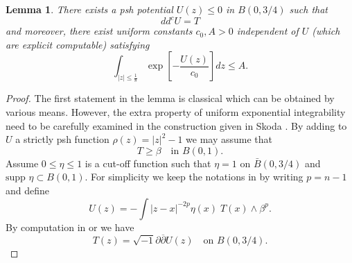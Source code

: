 \documentclass{amsart}
\renewcommand{\d}{\partial}
\newcommand{\ddbar}{\sqrt{-1}\d\overline{\d}}
\newcommand{\be}{\beta}
\newcommand{\supp}{\mbox{supp }}
\newtheorem{lem}[thm]{Lemma}
\theoremstyle{definition}
\numberwithin{thm}{section}
\numberwithin{equation}{section}
\renewcommand{\[}{\begin{equation}}
\renewcommand{\]}{\end{equation}}
\newcommand{\wed}{\wedge}
\begin{document}
\begin{lem} \label{lem:skoda-lelong}  There exists a psh potential $U(z) \leq 0$ in $ B(0,3/4)$ such that
 $$
 	dd^c U = T
 $$
and 
moreover, there exist uniform constants $c_0, A>0$ independent of $U$ (which are explicit computable) satisfying
 $$
 	\int_{|z| \leq \frac{1}{8}} \exp \left[ - \frac{U(z)}{c_0} \right] dz \leq  A.
 $$
\end{lem}

\begin{proof}
The first statement in the lemma is classical which can be obtained by various means. However, the extra property of uniform exponential integrability need to be carefully examined in the construction given in Skoda \cite[Section~7]{Sk72}.  By adding to $U$ a strictly psh function $\rho (z) = |z|^2-1$  we may assume that 
 \[ \label{eq:red-post} T \geq \be \quad \text{in } B(0,1).
 \]
Assume $0\leq \eta \leq 1$ is a cut-off function such that $\eta =1$ on $\bar B(0, 3/4)$ and $\supp\eta \subset B(0,1)$. For simplicity we keep the notations in \cite{Sk72} by writing $p= n-1$ and define 
$$
	U (z) = - \int |z-x|^{-2p} \eta (x) \;  T(x) \wed \be^p.
$$ 
By computation in \cite[Section~3]{Sk72} or  \cite[Lemma~4.3.4]{Ho07} we have
$$
	T(z) = \ddbar U (z) \quad\text{on } B(0,3/4).
$$



\end{proof}
\end{document}
